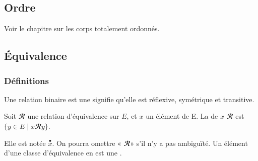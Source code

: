 \subsection{Ordre}
Voir le chapitre sur les corps totalement ordonnés.
\subsection[Équivalence]{Équivalence}
\subsubsection{Définitions}
\begin{definition}
[Équivalence]
Une relation binaire est une  signifie qu'elle est réflexive,
symétrique et transitive.
\end{definition}
\begin{terminology}
Soit \(𝓡\) une relation d'équivalence sur \(𝐸\), et \(𝑥\) un élément de
E. La  de \(𝑥\) 
\(𝓡\) est \(\bigl\{𝑦∈𝐸\mathbin{|}𝑥𝓡𝑦\bigr\}\).

Elle est notée \(\overset{∙}{𝑥}\). On pourra omettre
« \(𝓡\)» s'il n'y a pas ambiguïté.
Un élément d'une classe d'équivalence en est une .
\end{terminology}
%

